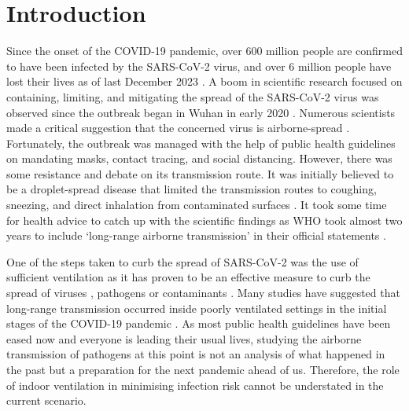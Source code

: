 \documentclass[a4paper,12pt]{elsarticle}
\begin{document}

\section{Introduction}
\label{sec:sample1}

Since the onset of the COVID-19 pandemic, over 600 million people are confirmed to have been infected by the SARS-CoV-2 virus, and over 6 million people have lost their lives as of last December 2023 \cite{world2023therapeutics}. A boom in scientific research focused on containing, limiting, and mitigating the spread of the SARS-CoV-2 virus was observed since the outbreak began in Wuhan in early 2020 \cite{morawska2020can,morawska2020time}. Numerous scientists made a critical suggestion that the concerned virus is airborne-spread \cite{zhang2020identifying,bazant2021guideline,morawska2020airborne}. Fortunately, the outbreak was managed with the help of public health guidelines on mandating masks, contact tracing, and social distancing. However, there was some resistance and debate on its transmission route. It was initially believed to be a droplet-spread disease that limited the transmission routes to coughing, sneezing, and direct inhalation from contaminated surfaces \citep{chagla2021re}. It took some time for health advice to catch up with the scientific findings as WHO took almost two years to include `long-range airborne transmission' in their official statements \cite{lewis2022took}. 

One of the steps taken to curb the spread of SARS-CoV-2 was the use of sufficient ventilation as it has proven to be an effective measure to curb the spread of viruses \cite{ren2021numerical}, pathogens \cite{berrouk2010experimental} or contaminants \cite{li2020investigating}. Many studies have suggested that long-range transmission occurred inside poorly ventilated settings in the initial stages of the COVID-19 pandemic \cite{morawska2020can,li2021probable, liu2021simulation}. As most public health guidelines have been eased now and everyone is leading their usual lives, studying the airborne transmission of pathogens at this point is not an analysis of what happened in the past but a preparation for the next pandemic ahead of us. Therefore, the role of indoor ventilation in minimising infection risk cannot be understated in the current scenario.
\end{document}
